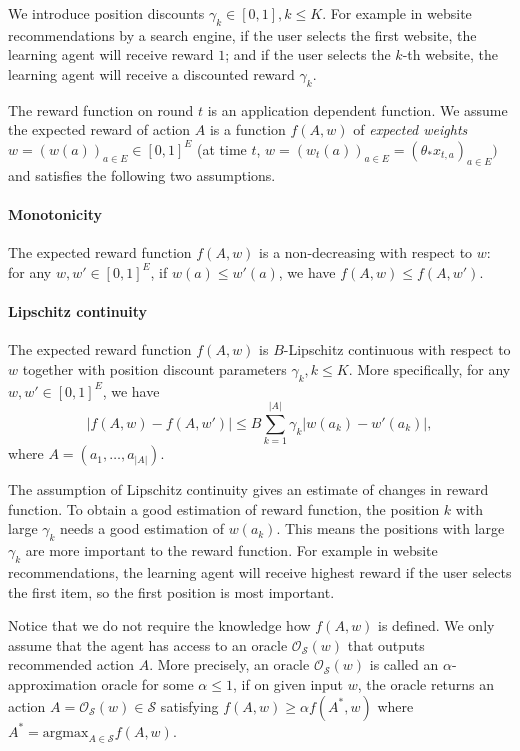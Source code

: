 \documentclass{article}
\newcommand{\cO}{\mathcal{O}}
\newcommand{\cS}{\mathcal{S}}
\newcommand{\argmax}{\mathrm{argmax}}
\begin{document}
We introduce position discounts $\gamma_k \in [0,1], k\leq K$. For example in website recommendations by a search engine, if the user selects the first website, the learning agent will receive reward $1$; and if the user selects the $k$-th website, the learning agent will receive a discounted reward $\gamma_k$.

The reward function on round $t$ is an application dependent function. We assume the expected reward of action $A$ is a function $f(A,w)$ of {\it expected weights} $w = (w(a))_{a \in E} \in [0,1]^{E}$ (at time $t$, $w = (w_t(a))_{a \in E} = (\theta_{\ast}x_{t,a})_{a \in E}) $ and satisfies the following two assumptions.

\paragraph{Monotonicity}
The expected reward function $f(A, w)$ is a non-decreasing with respect to $w$: for any $w,w'\in [0,1]^E$, if $w(a) \leq w'(a)$, we have $f(A, w) \leq f(A, w')$.

\paragraph{Lipschitz continuity}
The expected reward function $f(A, w)$ is $B$-Lipschitz continuous with respect to $w$ together with position discount parameters $\gamma_k, k\leq K$. More specifically, for any $w,w' \in [0,1]^E$, we have
$$
	|f(A, w) - f(A, w')| \leq B \sum_{k=1}^{|A|} \gamma_k |w(a_k) - w'(a_k)|,
$$
where $A = (a_1, \ldots, a_{|A|})$.

The assumption of Lipschitz continuity gives an estimate of changes in reward function. To obtain a good estimation of reward function, the position $k$ with large $\gamma_k$ needs a good estimation of $w(a_k)$. This means the positions with large $\gamma_k$ are more important to the reward function. For example in website recommendations, the learning agent will receive highest reward if the user selects the first item, so the first position is most important. 

Notice that we do not require the knowledge how $f(A, w)$ is defined. We only assume that the agent has access to an oracle $\cO_{\cS}(w)$ that outputs recommended action $A$. More precisely, an oracle $\cO_{\cS}(w)$ is called an $\alpha$-approximation oracle for some $\alpha \leq 1$, if on given input $w$, the oracle returns an action $A = \cO_{\cS}(w) \in \cS$ satisfying $f(A,w) \geq \alpha f(A^*,w)$ where $A^* = \argmax_{A\in\cS} f(A, w)$.
\end{document}
